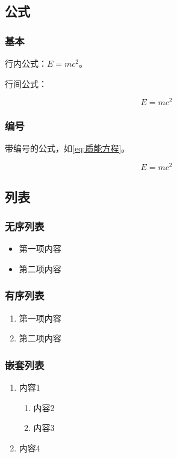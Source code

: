 \subsection{公式}

\subsubsection{基本}

行内公式：$E=mc^2$。

行间公式：

$$
E=mc^2
$$

\subsubsection{编号}

带编号的公式，如\ref{eq:质能方程}。

\begin{equation}
E=mc^2
\label{eq:质能方程}
\end{equation}



\subsection{列表}

\subsubsection{无序列表}

\begin{itemize}
    \item 第一项内容
    \item 第二项内容
\end{itemize}

\subsubsection{有序列表}

\begin{enumerate}
    \item 第一项内容
    \item 第二项内容
\end{enumerate}

\subsubsection{嵌套列表}

\begin{enumerate}
    \item 内容1
    \begin{enumerate}
        \item 内容2
        \item 内容3
    \end{enumerate}
    \item 内容4
\end{enumerate}


